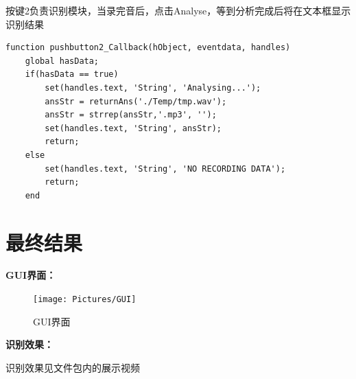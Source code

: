 \documentclass[11pt,a4paper,UTF8]{ctexart}
\begin{document}
	按键2负责识别模块，当录完音后，点击Analyse，等到分析完成后将在文本框显示识别结果
\begin{lstlisting}
function pushbutton2_Callback(hObject, eventdata, handles)
	global hasData;
	if(hasData == true)
		set(handles.text, 'String', 'Analysing...');
		ansStr = returnAns('./Temp/tmp.wav');
		ansStr = strrep(ansStr,'.mp3', '');
		set(handles.text, 'String', ansStr);
		return;
	else
		set(handles.text, 'String', 'NO RECORDING DATA');
		return;
	end
\end{lstlisting}
\section{最终结果}
	\textbf{GUI界面：}
	
	\begin{figure}[H]
		\centering
		\texttt{[image: Pictures/GUI]}
		\caption{GUI界面}
		\label{fig:gui}
	\end{figure}

	\textbf{识别效果：}
	
	识别效果见文件包内的展示视频
	

	\newpage
\end{document}
